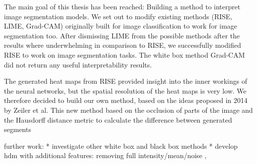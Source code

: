 The main goal of this thesis has been reached: Building a method to interpret image segmentation models. We set out to modify existing methods (RISE, LIME, Grad-CAM) originally built for image classification to work for image segmentation too. After dismissing LIME from the possible methods after the results where underwhelming in comparison to RISE, we successfully modified RISE to work on image segmentation tasks. The white box method Grad-CAM did not return any useful interpretability results.

The generated heat maps from RISE provided insight into the inner workings of the neural networks, but the spatial resolution of the heat maps is very low. We therefore decided to build our own method, based on the ideas proposed in 2014 by Zeiler et al. This new method based on the occlusion of parts of the image and the Hausdorff distance metric to calculate the difference between generated segments 



further work:
* investigate other white box and black box methods
* develop hdm with additional features: removing full intensity/mean/noise ,